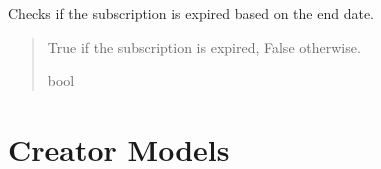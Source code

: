 \documentclass[letterpaper,10pt,english]{sphinxmanual}
\begin{document}
\begin{fulllineitems}
\begin{fulllineitems}
\begin{quote}
\begin{description}
\end{description}\end{quote}

\end{fulllineitems}


\begin{fulllineitems}
\label{\detokenize{modules/models:client.models.Subscription.is_expired}}
\pysigstartsignatures
{}
\pysigstopsignatures
\sphinxAtStartPar
Checks if the subscription is expired based on the end date.
\begin{quote}\begin{description}
\sphinxAtStartPar
True if the subscription is expired, False otherwise.

\sphinxAtStartPar
bool

\end{description}\end{quote}

\end{fulllineitems}


\end{fulllineitems}



\section{Creator Models}
\label{\detokenize{modules/models:module-creator.models}}\label{\detokenize{modules/models:creator-models}}
\end{document}
